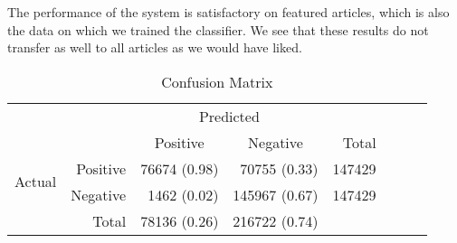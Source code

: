 
The performance of the system is satisfactory on featured articles, which is also the data on which we trained the classifier. We see that these results do not transfer as well to all articles as we would have liked.



\begin{table}[tbp]
    \centering
     \begin{tabular}{rrrrrrrr}
      \toprule
      \multicolumn{2}{c}{} & \multicolumn{2}{c}{Predicted} & \\
      \cmidrule{3-4}
      \multicolumn{2}{c}{} & \multicolumn{1}{c}{Positive} & \multicolumn{1}{c}{Negative} & Total \\
      \midrule
      \multirow{2}{*}{Actual} & Positive & \num{76674} (0.98) & \num{70755} (0.33)  & \num{147429} \\
                              & Negative & \num{1462} (0.02)  & \num{145967} (0.67) & \num{147429} \\
                              \cmidrule{1-2}
                              & Total    & \num{78136} (0.26) & \num{216722} (0.74) \\
      \bottomrule
    \end{tabular}
    \caption[Confusion Matrix]{Confusion Matrix}%
    \label{tab:confusionmatrix}
\end{table}

